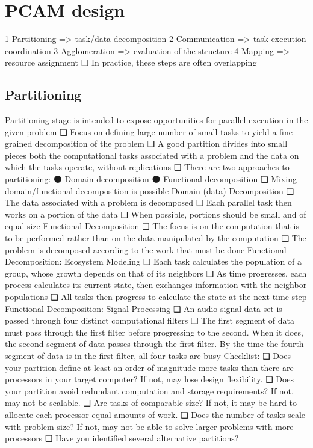 \section{PCAM design}

1 Partitioning =>
task/data decomposition
2 Communication => task
execution coordination
3 Agglomeration =>
evaluation of the
structure
4 Mapping => resource
assignment
❑ In practice, these steps
are often overlapping

\subsection{Partitioning}
Partitioning stage is intended to expose
opportunities for parallel execution in the given
problem
❑ Focus on defining large number of small tasks to
yield a fine-grained decomposition of the problem
❑ A good partition divides into small pieces both the
computational tasks associated with a problem and
the data on which the tasks operate, without
replications
❑ There are two approaches to partitioning:
⚫ Domain decomposition
⚫ Functional decomposition
❑ Mixing domain/functional decomposition is possible
Domain (data) Decomposition
❑ The data associated with a problem is decomposed
❑ Each parallel task then works on a portion of the
data
❑ When possible, portions should be small and of
equal size
Functional Decomposition
❑ The focus is on the computation that is to be
performed rather than on the data manipulated by
the computation
❑ The problem is decomposed according to the work
that must be done
Functional Decomposition:
Ecosystem Modeling
❑ Each task calculates the population of a group,
whose growth depends on that of its neighbors
❑ As time progresses, each process calculates its
current state, then exchanges information with the
neighbor populations
❑ All tasks then progress to calculate the state at the
next time step
Functional Decomposition: Signal
Processing
❑ An audio signal data set is passed through four
distinct computational filters
❑ The first segment of data must pass through the
first filter before progressing to the second. When
it does, the second segment of data passes
through the first filter. By the time the fourth
segment of data is in the first filter, all four tasks
are busy
Checklist:
❑ Does your partition define at least an order of
magnitude more tasks than there are processors
in your target computer? If not, may lose design flexibility.
❑ Does your partition avoid redundant computation
and storage requirements? If not, may not be scalable.
❑ Are tasks of comparable size? If not, it may be hard to
allocate each processor equal amounts of work.
❑ Does the number of tasks scale with problem size?
If not, may not be able to solve larger problems with more
processors
❑ Have you identified several alternative partitions?


